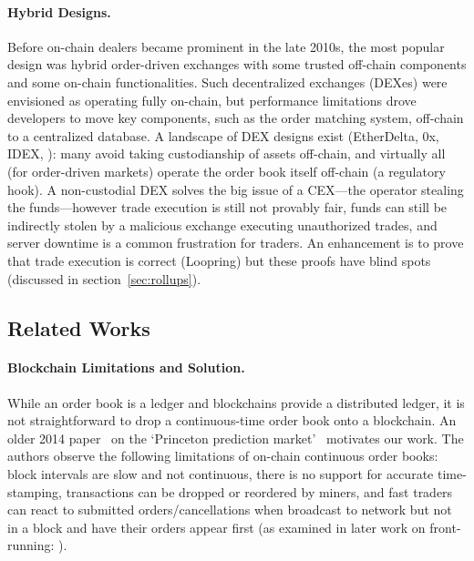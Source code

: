 \paragraph{Hybrid Designs.} Before on-chain dealers became prominent in the late 2010s, the most popular design was hybrid order-driven exchanges with some trusted off-chain components and some on-chain functionalities. Such decentralized exchanges (DEXes) were envisioned as operating fully on-chain, but performance limitations drove developers to move key components, such as the order matching system, off-chain to a centralized database. A landscape of DEX designs exist (\eg EtherDelta, 0x, IDEX, \etc): many avoid taking custodianship of assets off-chain, and virtually all (for order-driven markets) operate the order book itself off-chain (a regulatory hook). A non-custodial DEX solves the big issue of a CEX---the operator stealing the funds---however trade execution is still not provably fair, funds can still be indirectly stolen by a malicious exchange executing unauthorized trades, and server downtime is a common frustration for traders. An enhancement is to prove that trade execution is correct (\eg Loopring) but these proofs have blind spots (discussed in section~\ref{sec:rollups}). 

\subsection{Related Works}

\paragraph{Blockchain Limitations and Solution.} While an order book is a ledger and blockchains provide a distributed ledger, it is not straightforward to drop a continuous-time order book onto a blockchain. An older 2014 paper~\cite{clark2014decentralizing} on the `Princeton prediction market'~\cite{Bra13} motivates our work. The authors observe the following limitations of on-chain continuous order books: block intervals are slow and not continuous, there is no support for accurate time-stamping, transactions can be dropped or reordered by miners, and fast traders can react to submitted orders/cancellations when broadcast to network but not in a block and have their orders appear first (as examined in later work on front-running: \cite{eskandari2019sok,daian2019flash}).


